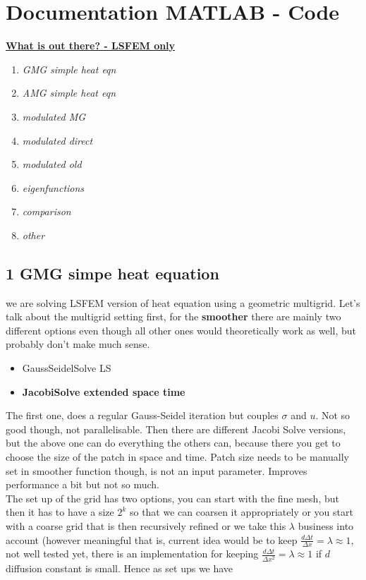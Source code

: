 \documentclass[a4paper, 11pt]{article}
\begin{document}
\section*{Documentation MATLAB - Code}
\underline{\textbf{What is out there? - LSFEM only}}
\begin{enumerate}
	\item \textit{GMG simple heat eqn}
	\item \textit{AMG simple heat eqn}
	\item \textit{modulated MG}
	\item \textit{modulated direct}
	\item \textit{modulated old}
	\item \textit{eigenfunctions}
	\item \textit{comparison}
	\item \textit{other}
\end{enumerate}
\subsection*{1 GMG simpe heat equation}

we are solving LSFEM version of heat equation using a geometric multigrid. Let's talk about the multigrid setting first, for the \textbf{smoother} there are mainly two different options even though all other ones would theoretically work as well, but probably don't make much sense.
\begin{itemize}
	\item GaussSeidelSolve LS
	\item \textbf{JacobiSolve extended space time}
\end{itemize}
The first one, does a regular Gauss-Seidel iteration but couples $\sigma$ and $u$. Not so good though, not parallelisable. Then there are different Jacobi Solve versions, but the above one can do everything the others can, because there you get to choose the size of the patch in space and time. Patch size needs to be manually set in smoother function though, is not an input parameter. Improves performance a bit but not so much. 
\bigskip\\
The set up of the grid has two options, you can start with the fine mesh, but then it has to have a size $2^k$ so that we can coarsen it appropriately or you start with a coarse grid that is then recursively refined or we take this $\lambda$
business into account (however meaningful that is, current idea would be to keep $\frac{d \Delta t}{\Delta x} = \lambda \approx 1$, not well tested yet, there is an implementation for keeping $\frac{d \Delta t}{\Delta x^2} = \lambda \approx 1$ if $d$ diffusion constant is small. Hence as set ups we have 
\end{document}
